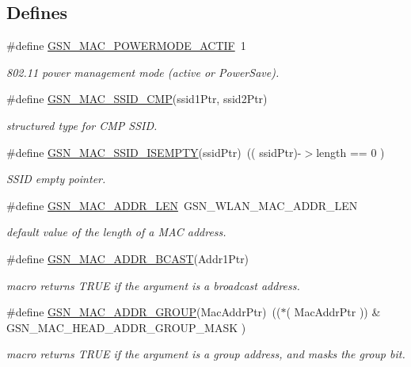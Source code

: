 \subsection*{Defines}
\begin{DoxyCompactItemize}
\item 
\#define \hyperlink{a00642_gac05267227cbd1ea16b61aa98de2050cc}{GSN\_\-MAC\_\-POWERMODE\_\-ACTIF}~1
\begin{DoxyCompactList}\small\item\em 802.11 power management mode (active or PowerSave). \end{DoxyCompactList}\item 
\#define \hyperlink{a00642_ga884676614ce794771a22a5ea358a25cf}{GSN\_\-MAC\_\-SSID\_\-CMP}(ssid1Ptr, ssid2Ptr)
\begin{DoxyCompactList}\small\item\em structured type for CMP SSID. \end{DoxyCompactList}\item 
\#define \hyperlink{a00642_ga216e78da30032f04c2c3a222478ed85e}{GSN\_\-MAC\_\-SSID\_\-ISEMPTY}(ssidPtr)~(( ssidPtr)-\/$>$length == 0 )
\begin{DoxyCompactList}\small\item\em SSID empty pointer. \end{DoxyCompactList}\item 
\#define \hyperlink{a00642_gaeeeab57b53de2e9a366c2b883e008f5e}{GSN\_\-MAC\_\-ADDR\_\-LEN}~GSN\_\-WLAN\_\-MAC\_\-ADDR\_\-LEN
\begin{DoxyCompactList}\small\item\em default value of the length of a MAC address. \end{DoxyCompactList}\item 
\#define \hyperlink{a00642_gad81b63f034b99768727bc1514ba5c175}{GSN\_\-MAC\_\-ADDR\_\-BCAST}(Addr1Ptr)
\begin{DoxyCompactList}\small\item\em macro returns TRUE if the argument is a broadcast address. \end{DoxyCompactList}\item 
\#define \hyperlink{a00642_ga95d4817391976ee04a12a20613cacc4c}{GSN\_\-MAC\_\-ADDR\_\-GROUP}(MacAddrPtr)~(($\ast$( MacAddrPtr )) \& GSN\_\-MAC\_\-HEAD\_\-ADDR\_\-GROUP\_\-MASK )
\begin{DoxyCompactList}\small\item\em macro returns TRUE if the argument is a group address, and masks the group bit. \end{DoxyCompactList}\item 

\end{DoxyCompactItemize}
